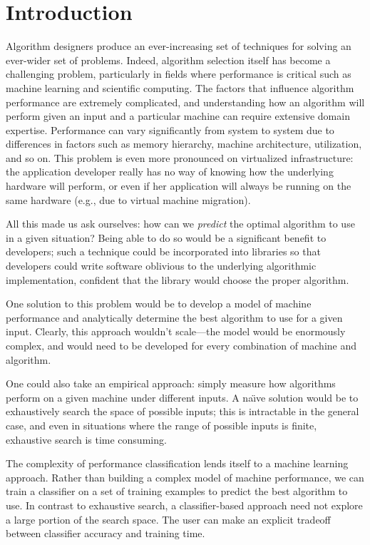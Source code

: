 \section{Introduction}
\label{s:intro}
Algorithm designers produce an ever-increasing set of techniques for solving an ever-wider set of problems.
Indeed, algorithm selection itself has become a challenging problem, particularly in fields where performance is critical such as machine learning and scientific computing.
The factors that influence algorithm performance are extremely complicated, and understanding how an algorithm will perform given an input and a particular machine can require extensive domain expertise.
Performance can vary significantly from system to system due to differences in factors such as memory hierarchy, machine architecture, utilization, and so on.
This problem is even more pronounced on virtualized infrastructure: the application developer really has no way of knowing how the underlying hardware will perform, or even if her application will always be running on the same hardware (e.g., due to virtual machine migration).

All this made us ask ourselves: how can we \emph{predict} the optimal algorithm to use in a given situation?
Being able to do so would be a significant benefit to developers; such a technique could be incorporated into libraries so that developers could write software oblivious to the underlying algorithmic implementation, confident that the library would choose the proper algorithm.

One solution to this problem would be to develop a model of machine performance and analytically determine the best algorithm to use for a given input.
Clearly, this approach wouldn't scale---the model would be enormously complex, and would need to be developed for every combination of machine and algorithm.

One could also take an empirical approach: simply measure how algorithms perform on a given machine under different inputs.
A na\"{\i}ve solution would be to exhaustively search the space of possible inputs; this is intractable in the general case, and even in situations where the range of possible inputs is finite, exhaustive search is time consuming.

The complexity of performance classification lends itself to a machine learning approach.
Rather than building a complex model of machine performance, we can train a classifier on a set of training examples to predict the best algorithm to use.
In contrast to exhaustive search, a classifier-based approach need not explore a large portion of the search space.
The user can make an explicit tradeoff between classifier accuracy and training time.

